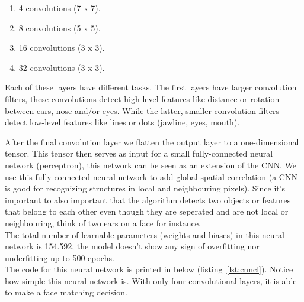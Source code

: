 \begin{enumerate}
  \item 4 convolutions (7 x 7).
  \item 8 convolutions (5 x 5).
  \item 16 convolutions (3 x 3).
  \item 32 convolutions (3 x 3).
\end{enumerate}

Each of these layers have different tasks. The first layers have larger convolution filters, these convolutions detect high-level features like distance or rotation between ears, nose and/or eyes. While the latter, smaller convolution filters detect low-level features like lines or dots (jawline, eyes, mouth).

After the final convolution layer we flatten the output layer to a one-dimensional tensor. This tensor then serves as input for a small fully-connected neural network (perceptron), this network can be seen as an extension of the CNN. We use this fully-connected neural network to add global spatial correlation (a CNN is good for recognizing structures in local and neighbouring pixels). Since it's important to also important that the algorithm detects two objects or features that belong to each other even though they are seperated and are not local or neighbouring, think of two ears on a face for instance.\\

The total number of learnable parameters (weights and biases) in this neural network is 154.592, the model doesn't show any sign of overfitting nor underfitting up to 500 epochs.\\

The code for this neural network is printed in below (listing~\ref{lst:cnncl}). Notice how simple this neural network is. With only four convolutional layers, it is able to make a face matching decision.


